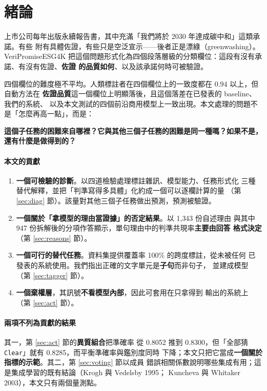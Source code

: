 \documentclass[11pt,a4paper]{ctexart}
\newcommand{\fn}[1]{\texttt{#1}}
\begin{document}
\tableofcontents
\newpage

\section{緒論}

上市公司每年出版永續報告書，其中充滿「我們將於 2030 年達成碳中和」這類承諾。有些
附有具體佐證，有些只是空泛宣示——後者正是漂綠（greenwashing）。VeriPromiseESG4K
把這個問題形式化為四個段落層級的分類欄位：這段有沒有承諾、有沒有佐證、\textbf{佐證
的品質如何}、以及該承諾何時可被驗證。

\medskip
四個欄位的難度極不平均。人類標註者在四個欄位上的一致度都在 0.94 以上，但自動方法在
\textbf{佐證品質}這一個欄位上明顯落後，且這個落差在已發表的 baseline、我們的系統、
以及本文測試的四個前沿商用模型上一致出現。本文處理的問題不是「怎麼再高一點」，而是：

\begin{tcolorbox}[colback=blue!5, colframe=blue!55]
\textbf{這個子任務的困難來自哪裡？它與其他三個子任務的困難是同一種嗎？如果不是，
還有什麼是做得到的？}
\end{tcolorbox}

\paragraph{本文的貢獻}
\begin{enumerate}[leftmargin=2.2em, itemsep=3pt]
  \item \textbf{一個可檢驗的診斷}。以四道檢驗處理標註雜訊、模型能力、任務形式化
        三種替代解釋，並把「判準寫得多具體」化約成一個可以逐欄計算的量
        （第 \ref{sec:diag} 節）。該量對其他三個子任務做出預測，預測被驗證。
  \item \textbf{一個關於「拿模型的理由當證據」的否定結果}。以 1{,}343 份自述理由
        與其中 947 份拆解後的分項作答顯示，單句理由中的判準共現率\textbf{主要由回答
        格式決定}（第 \ref{sec:reasons} 節）。
  \item \textbf{一個可行的替代任務}。資料集提供覆蓋率 100\% 的跨度標註，從未被任何
        已發表的系統使用。我們指出正確的文字單元是\textbf{子句}而非句子，
        並建成模型（第 \ref{sec:tagger} 節）。
  \item \textbf{一個棄權層}，其訊號\textbf{不看模型內部}，因此可套用在只拿得到
        輸出的系統上（第 \ref{sec:act} 節）。
\end{enumerate}

\paragraph{兩項不列為貢獻的結果} 其一，第 \ref{sec:act} 節的\textbf{異質組合}把準確率
從 0.8052 推到 0.8300，但「全部猜 \fn{Clear}」就有 0.8285，而平衡準確率與鑑別度同時
下降；本文只把它當成\textbf{一個關於指標的示範}。其二，第 \ref{sec:voting} 節以成員
錯誤相關係數說明哪些集成有用；這是集成學習的既有結論（Krogh 與 Vedelsby 1995；
Kuncheva 與 Whitaker 2003），本文只有兩個量測點。
\end{document}
